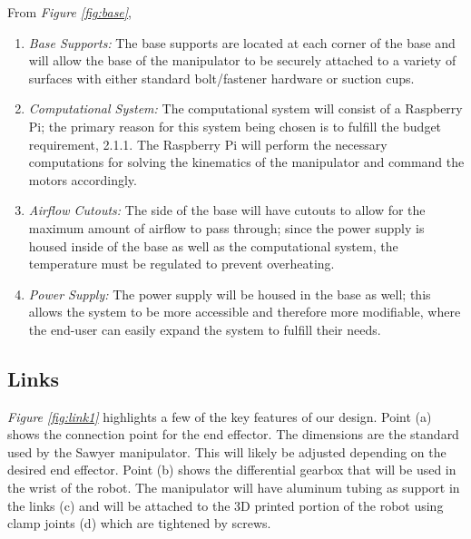 \documentclass[12pt]{report}
\begin{document}
From \emph{Figure \ref{fig:base}},
\vspace{-\baselineskip}
\begin{enumerate}[label=\alph*.]
  \item \emph{Base Supports:}
  The base supports are located at each corner of the base and will allow the base of the manipulator to be securely attached to a variety of surfaces with either standard bolt/fastener hardware or suction cups.
  \item \emph{Computational System:}
  The computational system will consist of a Raspberry Pi; the primary reason for this system being chosen is to fulfill the budget requirement, 2.1.1. The Raspberry Pi will perform the necessary computations for solving the kinematics of the manipulator and command the motors accordingly.
  \item \emph{Airflow Cutouts:}
  The side of the base will have cutouts to allow for the maximum amount of airflow to pass through; since the power supply is housed inside of the base as well as the computational system, the temperature must be regulated to prevent overheating.
  \item \emph{Power Supply:}
  The power supply will be housed in the base as well; this allows the system to be more accessible and therefore more modifiable, where the end-user can easily expand the system to fulfill their needs.
\end{enumerate}
\subsection{Links}
\emph{Figure \ref{fig:link1}} highlights a few of the key features of our design. Point (a) shows the connection point for the end effector. The dimensions are the standard used by the Sawyer manipulator. This will likely be adjusted depending on the desired end effector. Point (b) shows the differential gearbox that will be used in the wrist of the robot. The manipulator will have aluminum tubing as support in the links (c) and will be attached to the 3D printed portion of the robot using clamp joints (d) which are tightened by screws.
\end{document}
